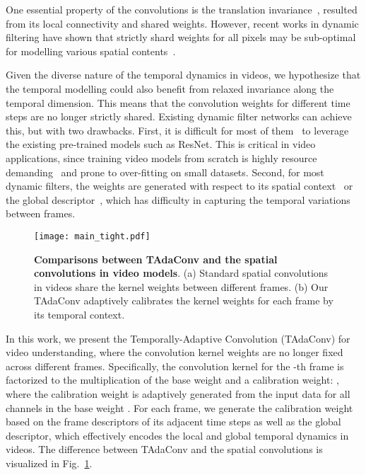 \documentclass{article} \usepackage{iclr2022_conference,times}
\begin{document}
One essential property of the convolutions is the translation invariance~\citep{ruderman1994statistics,simoncelli2001natural}, resulted from its local connectivity and shared weights. 
However, recent works in dynamic filtering have shown that strictly shard weights for all pixels may be sub-optimal for modelling various spatial contents~\citep{ddf,wu2018dynamic}.

Given the diverse nature of the temporal dynamics in videos, we hypothesize that the temporal modelling could also benefit from relaxed invariance along the temporal dimension. This means that the convolution weights for different time steps are no longer strictly shared.
Existing dynamic filter networks can achieve this, but with two drawbacks. First, it is difficult for most of them~\citep{ddf,condconv} to leverage the existing pre-trained models such as ResNet. This is critical in video applications, since training video models from scratch is highly resource demanding~\citep{slowfast,x3d} and prone to over-fitting on small datasets.
Second, for most dynamic filters, the weights are generated with respect to its spatial context~\citep{ddf,dynamicfilter} or the global descriptor~\citep{dycnn,condconv}, which has difficulty in capturing the temporal variations between frames.

\begin{figure}[t]
\centering
\vspace{-4mm}
\texttt{[image: main\_tight.pdf]}
\vspace{-3mm}
\caption{\textbf{Comparisons between TAdaConv and the spatial convolutions in video models}. 
(a) Standard spatial convolutions in videos share the kernel weights between different frames. 
(b) Our TAdaConv adaptively calibrates the kernel weights for each frame by its temporal context.
}
\vspace{-5mm}
\label{fig:spatialconvcomp}
\end{figure}

In this work,
we present the Temporally-Adaptive Convolution (TAdaConv) for video understanding, where the convolution kernel weights are no longer fixed across different frames. 
Specifically, the convolution kernel for the -th frame  is factorized to the multiplication of the base weight and a calibration weight: , where the calibration weight  is adaptively generated from the input data for all channels in the base weight . 
For each frame, we generate the calibration weight based on the frame descriptors of its adjacent time steps as well as the global descriptor, which effectively encodes the local and global temporal dynamics in videos. The difference between TAdaConv and the spatial convolutions is visualized in Fig.~\ref{fig:spatialconvcomp}.
\end{document}
